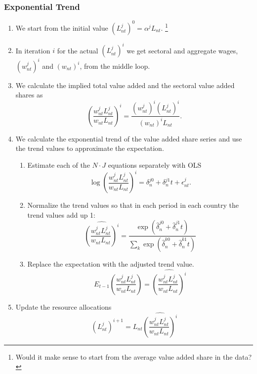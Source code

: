 \documentclass[11pt,oneside,a4paper]{article}
\begin{document}
\subsubsection{Exponential Trend}
%
\begin{enumerate}
  \item We start from the initial value $(L_{nt}^j)^0 = \alpha^j L_{nt}$. \footnote{Would it make sense to start from the average value added share in the data?}
  \item In iteration $i$ for the actual $(L_{nt}^j)^i$ we get sectoral and aggregate wages, $(w_{nt}^j)^i$ and $(w_{nt})^i$, from the middle loop.
  \item We calculate the implied total value added and the sectoral value added shares as
    $$\left(\frac{w_{nt}^j L_{nt}^j}{w_{nt} L_{nt}}\right)^i = \frac{(w_{nt}^j)^i (L_{nt}^j)^i}{(w_{nt})^i L_{nt}}.$$
  \item We calculate the exponential trend of the value added share series and use the trend values to approximate the expectation.
    \begin{enumerate}
      \item Estimate each of the $N \cdot J$ equations separately with OLS
        $$\log\left(\frac{w_{nt}^j L_{nt}^j}{w_{nt} L_{nt}}\right)^i = \delta_n^{j0} + \delta_n^{j1} t + \epsilon_{nt}^j.$$
      \item Normalize the trend values so that in each period in each country the trend values add up 1:
        $$\widehat{\left(\frac{w_{nt}^j L_{nt}^j}{w_{nt} L_{nt}}\right)^i} = \frac{\exp(\hat{\delta}_n^{j0} + \hat{\delta}_n^{j1} t)}{\sum_k \exp(\hat{\delta}_n^{k0} + \hat{\delta}_n^{k1} t)}$$
      \item Replace the expectation with the adjusted trend value.
      $$E_{t - 1} \left( \frac{w_{nt}^j L_{nt}^j}{w_{nt} L_{nt}}\right) = \widehat{\left(\frac{w_{nt}^j L_{nt}^j}{w_{nt} L_{nt}}\right)^i}$$
    \end{enumerate}
  \item Update the resource allocations
    $$(L_{nt}^j)^{i + 1} = L_{nt} \widehat{\left(\frac{w_{nt}^j L_{nt}^j}{w_{nt} L_{nt}}\right)^i}$$
\end{enumerate}
\end{document}
